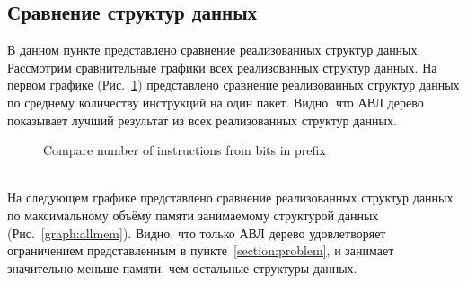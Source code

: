 \documentclass[9pt,a4paper]{article}
\begin{document}
        \subsection{Сравнение структур данных}
            В данном пункте представлено сравнение реализованных структур данных. Рассмотрим сравнительные графики всех реализованных структур данных.
            На первом графике (Рис.~\ref{graph:allinst}) представлено сравнение реализованных структур данных по среднему количеству инструкций на один пакет. Видно, что АВЛ дерево показывает лучший результат
            из всех реализованных структур данных.
            \\
            \begin{figure}[ht]
                \centering
                \captionsetup{justification=centering}
                \caption{Compare number of instructions from bits in prefix}
                \label{graph:allinst}
            \end{figure}
            \\
            На следующем графике представлено сравнение реализованных структур данных по максимальному объёму памяти занимаемому структурой данных (Рис.~\ref{graph:allmem}). Видно, что только АВЛ дерево удовлетворяет
            ограничением представленным в пункте~\ref{section:problem}, и занимает значительно меньше памяти, чем остальные структуры данных.
            \\
\end{document}
